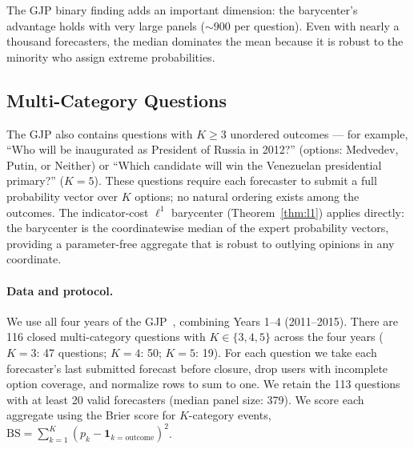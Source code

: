 The GJP binary finding adds an important dimension: the barycenter's advantage holds with very large panels ($\sim\!900$ per question).  Even with nearly a thousand forecasters, the median dominates the mean because it is robust to the minority who assign extreme probabilities.

\subsection{Multi-Category Questions}
\label{sec:gjp_multi}

The GJP also contains questions with $K \geq 3$ unordered outcomes --- for example, ``Who will be inaugurated as President of Russia in 2012?'' (options: Medvedev, Putin, or Neither) or ``Which candidate will win the Venezuelan presidential primary?'' ($K=5$).  These questions require each forecaster to submit a full probability vector over $K$ options; no natural ordering exists among the outcomes.  The indicator-cost $\ell^1$ barycenter (Theorem~\ref{thm:l1}) applies directly: the barycenter is the coordinatewise median of the expert probability vectors, providing a parameter-free aggregate that is robust to outlying opinions in any coordinate.

\paragraph{Data and protocol.}  We use all four years of the GJP~\cite{tetlock_dataverse}, combining Years 1--4 (2011--2015).  There are 116 closed multi-category questions with $K\in\{3,4,5\}$ across the four years ($K=3$: 47 questions; $K=4$: 50; $K=5$: 19).  For each question we take each forecaster's last submitted forecast before closure, drop users with incomplete option coverage, and normalize rows to sum to one.  We retain the 113 questions with at least 20 valid forecasters (median panel size: 379).  We score each aggregate using the Brier score for $K$-category events, $\mathrm{BS} = \sum_{k=1}^K (p_k - \mathbf{1}_{k=\text{outcome}})^2$.

